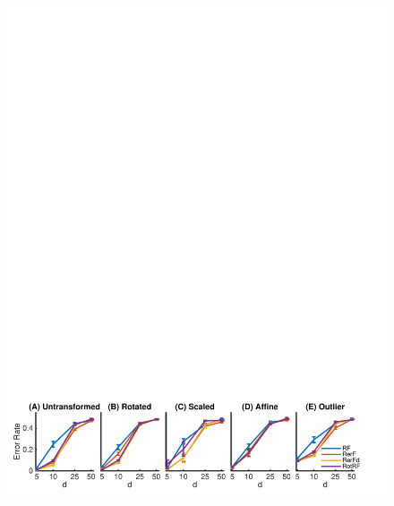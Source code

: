 \documentclass{article} %
\begin{document}
\begin{figure}[h]
\begin{center}
\includegraphics[trim=0in 0in 0in 0in, clip=true, width=\linewidth]{../Figures/pdf/Fig3_transformations2}
\end{center}
\caption{}
\label{fig:transformations}
\end{figure}
\end{document}
